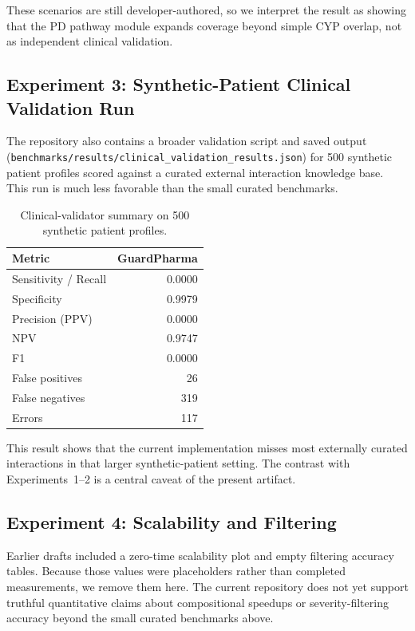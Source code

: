 \documentclass{article}
\theoremstyle{definition}
\begin{document}
These scenarios are still developer-authored, so we interpret the result as
showing that the PD pathway module expands coverage beyond simple CYP overlap,
not as independent clinical validation.

\subsection{Experiment 3: Synthetic-Patient Clinical Validation Run}

The repository also contains a broader validation script and saved output
(\texttt{benchmarks/results/clinical\_validation\_results.json}) for 500
synthetic patient profiles scored against a curated external interaction
knowledge base.  This run is much less favorable than the small curated
benchmarks.

\begin{table}[H]
\centering
\caption{Clinical-validator summary on 500 synthetic patient profiles.}
\label{tab:clinical-validator}
\begin{tabular}{@{}lr@{}}
\toprule
\textbf{Metric} & \textbf{GuardPharma} \\
\midrule
Sensitivity / Recall & 0.0000 \\
Specificity & 0.9979 \\
Precision (PPV) & 0.0000 \\
NPV & 0.9747 \\
F1 & 0.0000 \\
False positives & 26 \\
False negatives & 319 \\
Errors & 117 \\
\bottomrule
\end{tabular}
\end{table}

This result shows that the current implementation misses most externally
curated interactions in that larger synthetic-patient setting.  The contrast
with Experiments~1--2 is a central caveat of the present artifact.

\subsection{Experiment 4: Scalability and Filtering}

Earlier drafts included a zero-time scalability plot and empty filtering
accuracy tables.  Because those values were placeholders rather than completed
measurements, we remove them here.  The current repository does not yet support
truthful quantitative claims about compositional speedups or severity-filtering
accuracy beyond the small curated benchmarks above.
\end{document}
